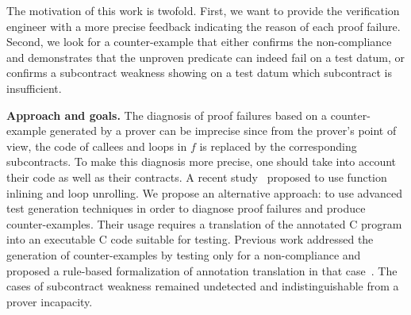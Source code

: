 \documentclass[web]{frama-c-book}
\begin{document}
The motivation of this work is twofold. First, we want to provide the
verification engineer with a more precise feedback indicating the reason of each
proof failure. Second, we look for a counter-example that either confirms the
non-compliance and demonstrates that the unproven predicate can indeed fail on a
test datum, or confirms a subcontract weakness
showing on a test datum which subcontract is insufficient.

\textbf{Approach and goals.}
The diagnosis of proof failures 
based on a counter-example generated by a prover can be imprecise
since from the prover's point of view,
the code of callees and loops in $f$ is replaced by the corresponding
subcontracts.
To make this diagnosis more precise, one should  
take into account their code as well as their contracts.
A recent study~\cite{Tschannen/14} proposed to use function inlining and loop unrolling.
We propose an alternative approach: to
use advanced test generation techniques in order to diagnose 
proof failures and produce counter-examples.
Their usage requires a translation of the annotated
C program
into an executable C code suitable for testing.
Previous work
addressed the generation of counter-examples by testing only for a
non-compli\-ance \cite{Petiot/TAP14} and proposed a rule-based formalization of
annotation translation
in that case~\cite{Petiot/SCAM14}.
The cases of subcontract weakness remained undetected and indistinguishable from
a prover incapacity.
\end{document}
